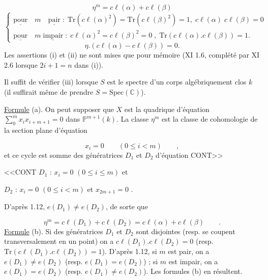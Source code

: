 \begin{equation*}
\eta^{m} = c\ell(\alpha) + c\ell(\beta)
\end{equation*}
\begin{equation*}
\left\{ \begin{array}{l} \underline{\mathrm{pour}} \quad m \quad \underline{\mathrm{pair}} \; : \; \mathrm{Tr}(c\ell(\alpha)^{2}) = \mathrm{Tr}(c\ell(\beta)^{2}) = 1, \; c\ell(\alpha) \; c\ell(\beta) = 0 \\[2ex] \underline{\mathrm{pour}} \quad m \; \underline{\mathrm{impair}} \; : \; c\ell(\alpha)^{2} = c\ell(\beta)^{2} = 0 \; , \; \mathrm{Tr}(c\ell(\alpha).c\ell(\beta)) = 1. \end{array} \right.
\end{equation*}
\begin{equation*}
\eta.(c\ell(\alpha) - c\ell(\beta)) = 0.
\end{equation*}
Les assertions (i) et (ii) ne sont mises que pour mémoire (XI 1.6, complété par XI 2.6 lorsque $2i + 1 = n$ dans (i)).

Il suffit de vérifier (iii) lorsque $S$ est le spectre d'un corps algébriquement clos $k$ (il suffirait même de prendre $S = \mathrm{Spec}(\mathbb{C})$).

\underline{Formule} (a). On peut supposer que $X$ est la quadrique d'équation $\sum\limits_{0}^{m} x_{i}x_{i+m+1} = 0$ dans $\mathbb{P}^{m+1}(k)$. La classe $\eta^{m}$ est la classe de cohomologie de la section plane d'équation

\begin{equation*}
x_{i} = 0 \qquad (0 \leqslant i < m) \qquad ,
\end{equation*}
et ce cycle est somme des génératrices $D_{1}$ et $D_{2}$ d'équation CONT>>



<<CONT $D_{1}$ : $x_{i} = 0$ $(0 \leqslant i \leqslant m)$ \quad et

$D_{2}$ : $x_{i} = 0$ $(0 \leqslant i < m)$ et $x_{2m+1} = 0$ .

D'après 1.12, $e(D_{1}) \neq e(D_{2})$, de sorte que

\begin{equation*}
\eta^{m} = c\ell(D_{1}) + c\ell(D_{2}) = c\ell(\alpha) + c\ell(\beta) \qquad .
\end{equation*}
\underline{Formule} (b). Si des génératrices $D_{1}$ et $D_{2}$ sont disjointes (resp. se coupent transversalement en un point) on a $c\ell(D_{1}).c\ell(D_{2}) = 0$ (resp. $\mathrm{Tr}(c\ell(D_{1}).c\ell(D_{2})) = 1$). D'après 1.12, si $m$ est pair, on a $e(D_{1}) \neq e(D_{2})$ (resp. $e(D_{1}) = e(D_{2})$) ; si $m$ est impair, on a $e(D_{1}) = e(D_{2})$ (resp. $e(D_{1}) \neq e(D_{2})$). Les formules (b) en résultent.

